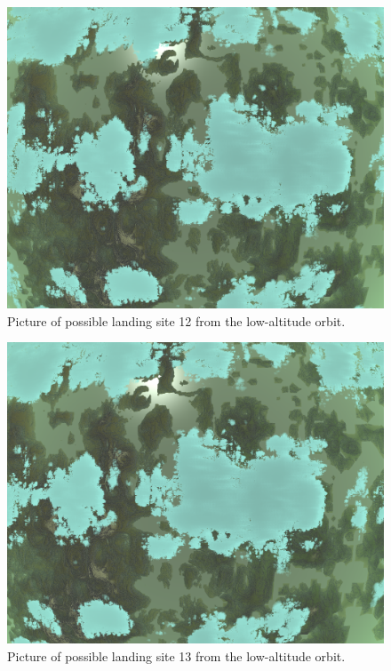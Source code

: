 \documentclass[reprint,english,notitlepage]{revtex4-2}
\begin{document}
    \begin{figure}[h]
        \centering
        \includegraphics[scale=0.14]{Figures/l_site12}
        \caption{Picture of possible landing site 12 from the low-altitude orbit.}\label{fig:l_site12}
    \end{figure}
    \begin{figure}[h]
        \centering
        \includegraphics[scale=0.14]{Figures/l_site13}
        \caption{Picture of possible landing site 13 from the low-altitude orbit.}\label{fig:l_site13}
    \end{figure}
\end{document}
